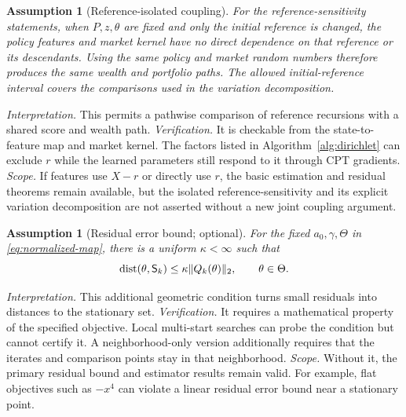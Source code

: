\documentclass[11pt]{article}
\newtheorem{assumption}[theorem]{Assumption}
\newcommand{\1}{\mathbf 1}
\newcommand{\dist}{\operatorname{dist}}
\DeclarePairedDelimiter{\norm}{\lVert}{\rVert}
\newcommand{\Sta}{\mathsf S}
\newcommand{\assess}[3]{\par\noindent\emph{Interpretation.} #1 \emph{Verification.} #2 \emph{Scope.} #3\par}
\begin{document}
\begin{assumption}[Reference-isolated coupling]\label{ass:reference-coupling}
For the reference-sensitivity statements, when $P,z,\theta$ are fixed and only the initial reference is changed, the policy features and market kernel have no direct dependence on that reference or its descendants. Using the same policy and market random numbers therefore produces the same wealth and portfolio paths. The allowed initial-reference interval covers the comparisons used in the variation decomposition.
\end{assumption}
\assess{This permits a pathwise comparison of reference recursions with a shared score and wealth path.}{It is checkable from the state-to-feature map and market kernel. The factors listed in Algorithm~\ref{alg:dirichlet} can exclude $r$ while the learned parameters still respond to it through CPT gradients.}{If features use $X-r$ or directly use $r$, the basic estimation and residual theorems remain available, but the isolated reference-sensitivity and its explicit variation decomposition are not asserted without a new joint coupling argument.}

\begin{assumption}[Residual error bound; optional]\label{ass:error-bound}
For the fixed $a_0,\gamma,\Theta$ in \eqref{eq:normalized-map}, there is a uniform $\kappa<\infty$ such that
\begin{equation}\label{eq:error-bound}
 \dist(\theta,\Sta_k)\le\kappa\norm{Q_k(\theta)}_2,
 \qquad \theta\in\Theta.
\end{equation}
\end{assumption}
\assess{This additional geometric condition turns small residuals into distances to the stationary set.}{It requires a mathematical property of the specified objective. Local multi-start searches can probe the condition but cannot certify it. A neighborhood-only version additionally requires that the iterates and comparison points stay in that neighborhood.}{Without it, the primary residual bound and estimator results remain valid. For example, flat objectives such as $-x^4$ can violate a linear residual error bound near a stationary point.}
\end{document}
